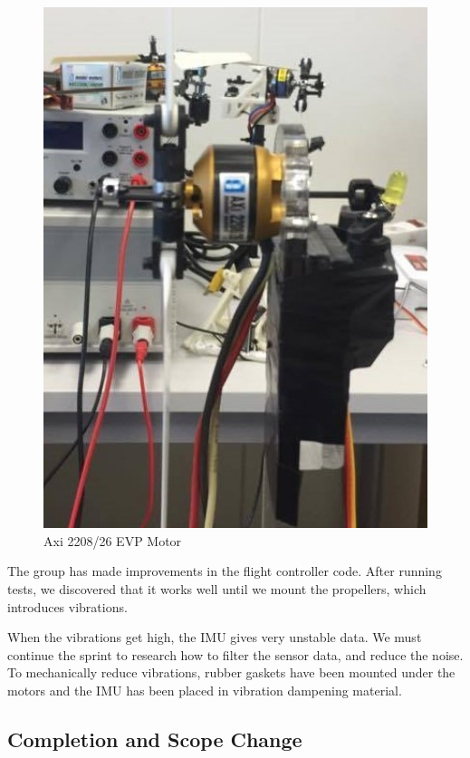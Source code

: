 \begin{figure}[h]
\begin{minipage}[b]{0.4\textwidth}
            \includegraphics[width = 1\textwidth]{VAPIQ-PICTURES/axi2208}
            \caption{Axi 2208/26 EVP Motor}
            \label{fig:aximotor}
        \end{minipage}
\end{figure}

The group has made improvements in the flight controller code. After running tests, we discovered that it works well until we mount the propellers, which introduces vibrations. 
 
When the vibrations get high, the IMU gives very unstable data. We must continue the sprint to research how to filter the sensor data, and reduce the noise. To mechanically reduce vibrations, rubber gaskets have been mounted under the motors and the IMU has been placed in vibration dampening material.

\subsection{Completion and Scope Change}

